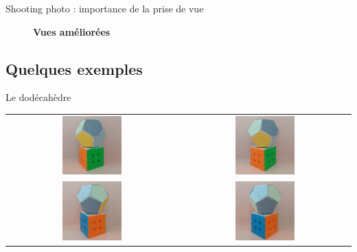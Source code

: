 \begin{frame}{Shooting photo : importance de la prise de vue}
\begin{minipage}{0.48\linewidth}
\begin{figure}
      {\footnotesize\textbf{Vues améliorées}}
    \end{figure}
  \end{minipage}
\end{frame}


\subsection{Quelques exemples}

\begin{frame}{Le dodécahèdre}
\begin{minipage}{0.40\textwidth}
    \centering
    \setlength{\tabcolsep}{0pt}
    \renewcommand{\arraystretch}{0}
    \begin{tabular}{cc}
        \includegraphics[width=0.36\textwidth]{capture/dodecf0.jpg} &
        \includegraphics[width=0.36\textwidth]{capture/dodecf1.jpg} \\
        \includegraphics[width=0.36\textwidth]{capture/dodecf2.jpg} &
        \includegraphics[width=0.36\textwidth]{capture/dodecf3.jpg} \\

\end{tabular}
\end{minipage}
\end{frame}
